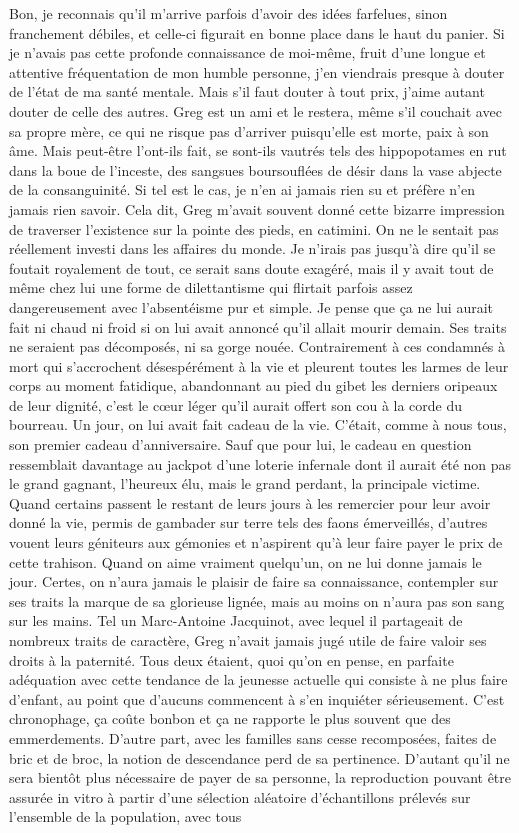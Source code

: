 Bon, je reconnais qu’il m’arrive parfois d’avoir des idées farfelues, sinon franchement débiles, et celle-ci figurait en bonne place dans le haut du panier. Si je n’avais pas cette profonde connaissance de moi-même, fruit d’une longue et attentive fréquentation de mon humble personne, j’en viendrais presque à douter de l’état de ma santé mentale. Mais s’il faut douter à tout prix, j’aime autant douter de celle des autres. Greg est un ami et le restera, même s’il couchait avec sa propre mère, ce qui ne risque pas d’arriver puisqu’elle est morte, paix à son âme. Mais peut-être l’ont-ils fait, se sont-ils vautrés tels des hippopotames en rut dans la boue de l’inceste, des sangsues boursouflées de désir dans la vase abjecte de la consanguinité. Si tel est le cas, je n’en ai jamais rien su et préfère n’en jamais rien savoir. Cela dit, Greg m’avait souvent donné cette bizarre impression de traverser l’existence sur la pointe des pieds, en catimini. On ne le sentait pas réellement investi dans les affaires du monde. Je n’irais pas jusqu’à dire qu’il se foutait royalement de tout, ce serait sans doute exagéré, mais il y avait tout de même chez lui une forme de dilettantisme qui flirtait parfois assez dangereusement avec l’absentéisme pur et simple. Je pense que ça ne lui aurait fait ni chaud ni froid si on lui avait annoncé qu’il allait mourir demain. Ses traits ne seraient pas décomposés, ni sa gorge nouée. Contrairement à ces condamnés à mort qui s’accrochent désespérément à la vie et pleurent toutes les larmes de leur corps au moment fatidique, abandonnant au pied du gibet les derniers oripeaux de leur dignité, c’est le cœur léger qu’il aurait offert son cou à la corde du bourreau. Un jour, on lui avait fait cadeau de la vie. C’était, comme à nous tous, son premier cadeau d’anniversaire. Sauf que pour lui, le cadeau en question ressemblait davantage au jackpot d’une loterie infernale dont il aurait été non pas le grand gagnant, l’heureux élu, mais le grand perdant, la principale victime. Quand certains passent le restant de leurs jours à les remercier pour leur avoir donné la vie, permis de gambader sur terre tels des faons émerveillés, d’autres vouent leurs géniteurs aux gémonies et n’aspirent qu’à leur faire payer le prix de cette trahison. Quand on aime vraiment quelqu’un, on ne lui donne jamais le jour. Certes, on n’aura jamais le plaisir de faire sa connaissance, contempler sur ses traits la marque de sa glorieuse lignée, mais au moins on n’aura pas son sang sur les mains. Tel un Marc-Antoine Jacquinot, avec lequel il partageait de nombreux traits de caractère, Greg n’avait jamais jugé utile de faire valoir ses droits à la paternité. Tous deux étaient, quoi qu’on en pense, en parfaite adéquation avec cette tendance de la jeunesse actuelle qui consiste à ne plus faire d’enfant, au point que d’aucuns commencent à s’en inquiéter sérieusement. C’est chronophage, ça coûte bonbon et ça ne rapporte le plus souvent que des emmerdements. D’autre part, avec les familles sans cesse recomposées, faites de bric et de broc, la notion de descendance perd de sa pertinence. D’autant qu’il ne sera bientôt plus nécessaire de payer de sa personne, la reproduction pouvant être assurée in vitro à partir d’une sélection aléatoire d’échantillons prélevés sur l’ensemble de la population, avec tous 